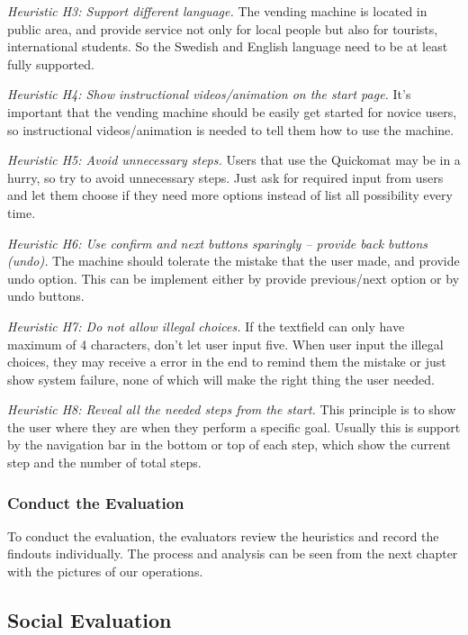 \documentclass[twocolumn]{article}
\begin{document}
\emph{Heuristic H3: Support different language.} The vending machine is located in public area, and provide service not only for local people but also for tourists, international students. So the Swedish and English language need to be at least fully supported.

\emph{Heuristic H4: Show instructional videos/animation on the start page.} It’s important that the vending machine should be easily get started for novice users, so instructional videos/animation is needed to tell them how to use the machine.

\emph{Heuristic H5: Avoid unnecessary steps.} Users that use the Quickomat may be in a hurry, so try to avoid unnecessary steps. Just ask for required input from users and let them choose if they need more options instead of list all possibility every time.

\emph{Heuristic H6: Use confirm and next buttons sparingly -- provide back buttons (undo).} The machine should tolerate the mistake that the user made, and provide undo option. This can be implement either by provide previous/next option or by undo buttons.

\emph{Heuristic H7: Do not allow illegal choices.} If the textfield can only have maximum of 4 characters, don’t let user input five. When user input the illegal choices, they may receive a error in the end to remind them the mistake or just show system failure, none of which will make the right thing the user needed.

\emph{Heuristic H8: Reveal all the needed steps from the start.} This principle is to show the user where they are when they perform a specific goal. Usually this is support by the navigation bar in the bottom or top of each step, which show the current step and the number of total steps.

\subsubsection{Conduct the Evaluation}
To conduct the evaluation, the evaluators review the heuristics and record the findouts individually. The process and analysis can be seen from the next chapter with the pictures of our operations.

\subsection{Social Evaluation}
\end{document}
